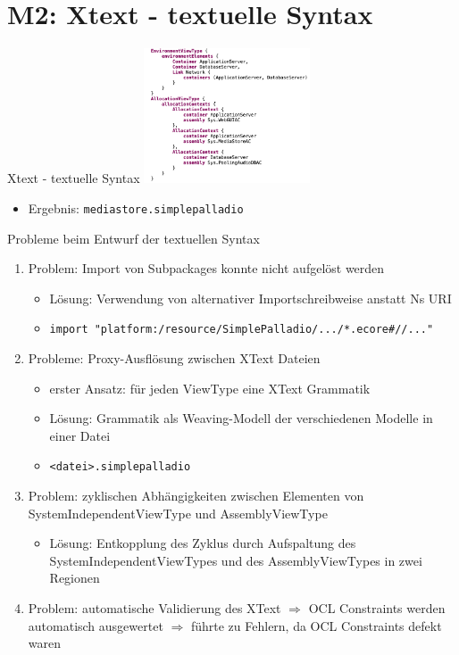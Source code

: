 \section[M2: Xtext]{M2: Xtext - textuelle Syntax}
\begin{frame}{Xtext - textuelle Syntax}
    \centering
    \includegraphics[height=40mm]{figures/xtext.png}
    \begin{itemize}
        \item Ergebnis: \texttt{mediastore.simplepalladio}
    \end{itemize}
\end{frame}

\begin{frame}{Probleme beim Entwurf der textuellen Syntax}
	\begin{enumerate}
		\item Problem: Import von Subpackages konnte nicht aufgelöst werden
		\begin{itemize}
            \item Lösung: Verwendung von alternativer Importschreibweise anstatt Ns URI
            \item \texttt{import "platform:/resource/SimplePalladio/.../*.ecore\#//..."}
        \end{itemize}
        \item Probleme: Proxy-Ausflösung zwischen XText Dateien
		\begin{itemize}
            \item erster Ansatz: für jeden ViewType eine XText Grammatik
            \item Lösung: Grammatik als Weaving-Modell der verschiedenen Modelle in einer Datei
            \item \texttt{<datei>.simplepalladio}
        \end{itemize}
        \item Problem: zyklischen Abhängigkeiten zwischen Elementen von SystemIndependentViewType und AssemblyViewType
        \begin{itemize}
            \item Lösung: Entkopplung des Zyklus durch Aufspaltung des SystemIndependentViewTypes und des AssemblyViewTypes in zwei Regionen
        \end{itemize}
        \item Problem: automatische Validierung des XText $\Rightarrow$ OCL Constraints werden automatisch ausgewertet $\Rightarrow$ führte zu Fehlern, da OCL Constraints defekt waren
	\end{enumerate}
\end{frame}